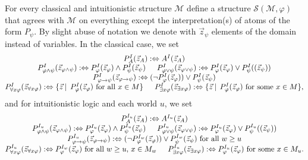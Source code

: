 \documentclass[a4paper,UKenglish,cleveref, autoref, thm-restate]{lipics-v2021}
\begin{document}
\begin{definition}\label{def:transf-structure}
	For every classical and intuitionistic structure $\mathcal M$ define a structure $\mathcal S(\mathcal M,\varphi)$ that agrees with $\mathcal M$ on everything except the interpretation(s) of atoms of the form $P_\psi$. By slight abuse of notation we denote with $\vec z_\psi$ elements of the domain instead of variables. In the classical case, we set
	$$\begin{matrix}
		P_A^I(\vec z_A):\Leftrightarrow A^I(\vec z_A)\\
		P_{\varphi\wedge\psi}^I(\vec z_{\varphi\wedge\psi}) :\Leftrightarrow P_{\varphi}^I(\vec z_\varphi)\wedge P_{\psi}^I(\vec z_\psi)\indent P_{\varphi\vee\psi}^I(\vec z_{\varphi\vee\psi}) :\Leftrightarrow P_{\varphi}^I(\vec z_\varphi)\vee P_{\psi}^I((\vec z_\psi))\\P_{\varphi\to\psi}^I(\vec z_{\varphi\to\psi}) :\Leftrightarrow (\neg P_{\varphi}^I(\vec z_{\varphi}))\vee P_{\psi}^I(\vec z_{\psi})\\P_{\forall x\varphi}^I(\vec z_{\forall x\varphi}) :\Leftrightarrow \{\vec z\:|\:\:P_{\varphi}^I(\vec z_\varphi) \text{ for all $x\in M$}\}\indent P_{\exists x\varphi}^I(\vec z_{\exists x\varphi}) :\Leftrightarrow \{\vec z\:|\:\:P_{\varphi}^I(\vec z_\varphi) \text{ for some $x\in M$}\},
	\end{matrix}$$
	and for intuitionistic logic and each world $u$, we set
	$$\begin{matrix}
		P_A^{I_u}(\vec z_A):\Leftrightarrow A^{I_u}(\vec z_A)\\
		P_{\varphi\wedge\psi}^{I_u}(\vec z_{\varphi\wedge\psi}) :\Leftrightarrow P_{\varphi}^{I_u}(\vec z_\varphi)\wedge P_{\psi}^{I_u}(\vec z_\psi)\indent P_{\varphi\vee\psi}^{I_u}(\vec z_{\varphi\vee\psi}) :\Leftrightarrow P_{\varphi}^{I_u}(\vec z_\varphi)\vee P_{\psi}^{I_u}((\vec z_\psi))\\
		P_{\varphi\to\psi}^{I_u}(\vec z_{\varphi\to\psi}) :\Leftrightarrow(\neg P_{\varphi}^{I_w}(\vec z_{\varphi}))\vee P_{\psi}^{I_w}(\vec z_{\psi})\text{ for all $w\geq u$}\\
		P_{\forall x\varphi}^{I_u}(\vec z_{\forall x\varphi}) :\Leftrightarrow P_{\varphi}^{I_w}(\vec z_\varphi) \text{ for all $w\geq u$, $x\in M_w$}\indent P_{\exists x\varphi}^{I_u}(\vec z_{\exists x\varphi}) :\Leftrightarrow P_{\varphi}^{I_u}(\vec z_\varphi) \text{ for some $x\in M_u$}.
	\end{matrix}$$
\end{definition}
\end{document}
